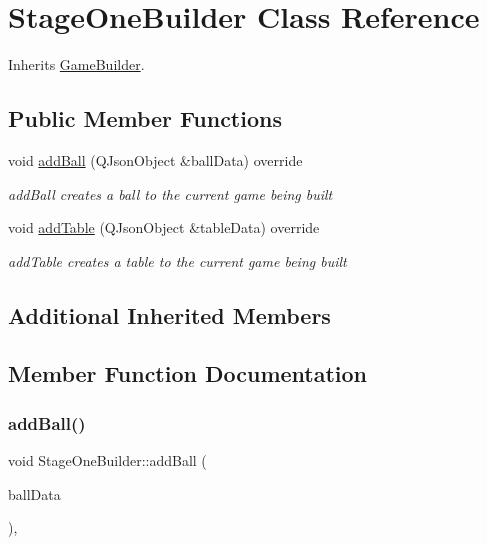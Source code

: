 \hypertarget{class_stage_one_builder}{}\section{Stage\+One\+Builder Class Reference}
\label{class_stage_one_builder}


Inherits \mbox{\hyperlink{class_game_builder}{Game\+Builder}}.

\subsection*{Public Member Functions}
\begin{DoxyCompactItemize}
\item 
void \mbox{\hyperlink{class_stage_one_builder_a9d7931aab89afcfa0b2c23da6fb10bfb}{add\+Ball}} (Q\+Json\+Object \&ball\+Data) override
\begin{DoxyCompactList}\small\item\em add\+Ball creates a ball to the current game being built \end{DoxyCompactList}\item 
void \mbox{\hyperlink{class_stage_one_builder_ac8f35ec11ebe31010410bc50b0149ce9}{add\+Table}} (Q\+Json\+Object \&table\+Data) override
\begin{DoxyCompactList}\small\item\em add\+Table creates a table to the current game being built \end{DoxyCompactList}\end{DoxyCompactItemize}
\subsection*{Additional Inherited Members}


\subsection{Member Function Documentation}
\mbox{\label{class_stage_one_builder_a9d7931aab89afcfa0b2c23da6fb10bfb}} 
\subsubsection{\texorpdfstring{add\+Ball()}{addBall()}}
{\footnotesize\ttfamily void Stage\+One\+Builder\+::add\+Ball (\begin{DoxyParamCaption}\item[{Q\+Json\+Object \&}]{ball\+Data }\end{DoxyParamCaption})\hspace{0.3cm}{\ttfamily [override]}, {\ttfamily [virtual]}}



